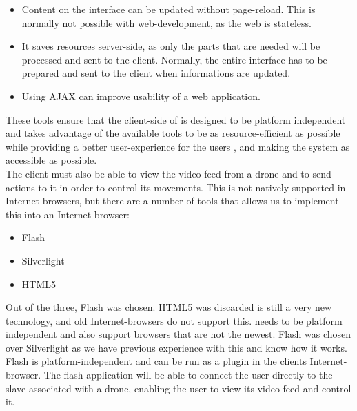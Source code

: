\begin{itemize}
	\item Content on the interface can be updated without page-reload. This is normally not possible with web-development, as the web is stateless.
	\item It saves resources server-side, as only the parts that are needed will be processed and sent to the client. Normally, the entire interface has to be prepared and sent to the client when informations are updated.
	\item Using AJAX can improve usability of a web application.
\end{itemize}

These tools ensure that the client-side of \projectname{} is designed to be platform independent and takes advantage of the available tools to be as resource-efficient as possible while providing a better user-experience for the users \citep{why_ajax_makes_the_user_experience_better}, and making the system as accessible as possible. \\

The client must also be able to view the video feed from a drone and to send actions to it in order to control its movements.
This is not natively supported in Internet-browsers, but there are a number of tools that allows us to implement this into an Internet-browser:

\begin{itemize}
	\item Flash
	\item Silverlight
	\item HTML5
\end{itemize}

Out of the three, Flash was chosen.
HTML5 was discarded is still a very new technology, and old Internet-browsers do not support this.
\projectname{} needs to be platform independent and also support browsers that are not the newest. 
Flash was chosen over Silverlight as we have previous experience with this and know how it works. \\

Flash is platform-independent and can be run as a plugin in the clients Internet-browser.
The flash-application will be able to connect the user directly to the slave associated with a drone, enabling the user to view its video feed and control it.

